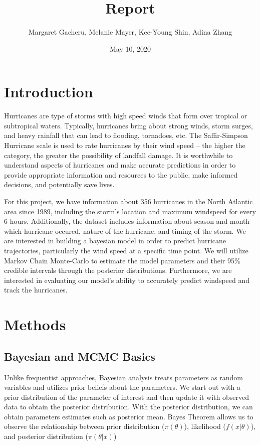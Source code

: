\documentclass[]{article}
\title{Report}
\author{Margaret Gacheru, Melanie Mayer, Kee-Young Shin, Adina Zhang}
\date{May 10, 2020}
\begin{document}
\maketitle

\hypertarget{introduction}{%
\section{Introduction}\label{introduction}}

Hurricanes are type of storms with high speed winds that form over
tropical or subtropical waters. Typically, hurricanes bring about strong
winds, storm surges, and heavy rainfall that can lead to flooding,
tornadoes, etc. The Saffir-Simpson Hurricane scale is used to rate
hurricanes by their wind speed -- the higher the category, the greater
the possibility of landfall damage. It is worthwhile to understand
aspects of hurricanes and make accurate predictions in order to provide
appropriate information and resources to the public, make informed
decisions, and potentially save lives.

For this project, we have information about 356 hurricanes in the North
Atlantic area since 1989, including the storm's location and maximum
windspeed for every 6 hours. Additionally, the dataset includes
information about season and month which hurricane occured, nature of
the hurricane, and timing of the storm. We are interested in building a
bayesian model in order to predict hurricane trajectories, particularly
the wind speed at a specific time point. We will utilize Markov Chain
Monte-Carlo to estimate the model parameters and their 95\% credible
intervals through the posterior distributions. Furthermore, we are
interested in evaluating our model's ability to accurately predict
windspeed and track the hurricanes.

\hypertarget{methods}{%
\section{Methods}\label{methods}}

\hypertarget{bayesian-and-mcmc-basics}{%
\subsection{Bayesian and MCMC Basics}\label{bayesian-and-mcmc-basics}}

Unlike frequentist approaches, Bayesian analysis treats parameters as
random variables and utilizes prior beliefs about the parameters. We
start out with a prior distribution of the parameter of interest and
then update it with observed data to obtain the posterior distribution.
With the posterior distribution, we can obtain parameters estimates such
as posterior mean. Bayes Theorem allows us to observe the relationship
between prior distribution (\(\pi(\theta)\)), likelihood
(\(f(x|\theta)\)), and posterior distribution (\(\pi(\theta|x)\))
\end{document}
